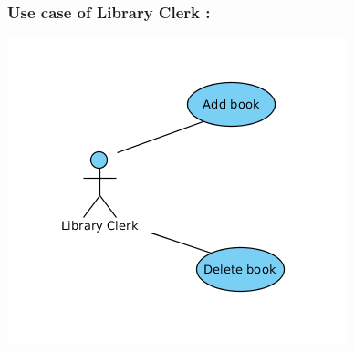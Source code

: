 \documentclass[a4paper]{article}
\begin{document}
\subsubsection*{Use case of Library Clerk :}
\includegraphics[scale=0.6]{images/clerkClassDiag.png}\\
\end{document}

